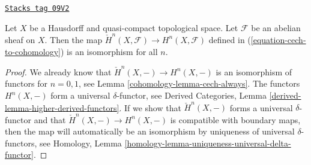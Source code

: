 \begin{lemma}
\label{cohomology-lemma-cech-Hausdorff-quasi-compact}
\href{https://stacks.math.columbia.edu/tag/09V2}{\texttt{Stacks tag 09V2}}

Let $X$ be a Hausdorff and quasi-compact topological space. Let
$\mathcal{F}$ be an abelian sheaf on $X$. Then
the map $\check{H}^n(X, \mathcal{F}) \to H^n(X, \mathcal{F})$ defined
in (\ref{equation-cech-to-cohomology}) is an isomorphism for
all $n$.
\end{lemma}

\begin{proof}

We already know that $\check{H}^n(X, -) \to H^n(X, -)$
is an isomorphism of functors for $n = 0, 1$, see
Lemma \ref{cohomology-lemma-cech-always}.
The functors $H^n(X, -)$ form a universal $\delta$-functor, see
Derived Categories, Lemma \ref{derived-lemma-higher-derived-functors}.
If we show that $\check{H}^n(X, -)$ forms a universal $\delta$-functor
and that $\check{H}^n(X, -) \to H^n(X, -)$ is compatible with boundary
maps, then the map will automatically be an isomorphism by uniqueness
of universal $\delta$-functors, see
Homology, Lemma \ref{homology-lemma-uniqueness-universal-delta-functor}.


\end{proof}

